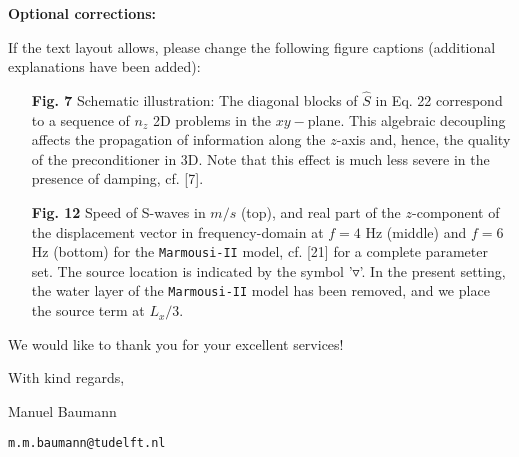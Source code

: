 \documentclass{article}
\newcommand{\marmousi}{\texttt{Marmousi-II} }
\begin{document}
\vspace{0.4cm}

\noindent \textbf{Optional corrections:}

If the text layout allows, please change the following figure captions (additional explanations have been added):
\begin{itemize}
 \item [\textbf{Fig. 7}] Schematic illustration: The diagonal blocks of $\hat{S}$ in Eq. 22 correspond to a sequence of $n_z$ 2D problems in the $xy-$plane. This algebraic decoupling affects the propagation of information along the $z$-axis and, hence, the quality of the preconditioner in 3D. Note that this effect is much less severe in the presence of damping, cf. [7].
 \item [\textbf{Fig. 12}] Speed of S-waves in $m/s$ (top), and real part of the $z$-component of the displacement vector in frequency-domain at $f=4$ Hz (middle) and $f=6$ Hz (bottom) for the \marmousi model, cf. [21] for a complete parameter set. The source location is indicated by the symbol '$\triangledown$'. In the present setting, the water layer of the \texttt{Marmousi-II} model has been removed, and we place the source term at $L_x/3$. 
\end{itemize}


\vspace{2cm}

\hfill We would like to thank you for your excellent services!

\vspace{0.4cm}

\hfill With kind regards,

\hfill Manuel Baumann

\hfill \texttt{m.m.baumann@tudelft.nl}
\end{document}
